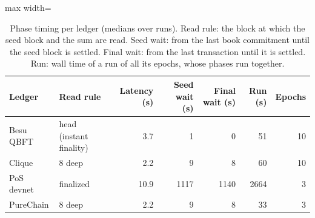 \begin{table}[!htbp]\centering\small
\caption{Phase timing per ledger (medians over runs). Read rule: the block at which the seed block and the sum are read. Seed wait: from the last book commitment until the seed block is settled. Final wait: from the last transaction until it is settled. Run: wall time of a run of all its epochs, whose phases run together.}\label{tab:ledgers}
\begin{adjustbox}{max width=\linewidth}\begin{tabular}{llrrrrr}\toprule
Ledger & Read rule & Latency (s) & Seed wait (s) & Final wait (s) & Run (s) & Epochs \\\midrule
Besu QBFT & head (instant finality) & 3.7 & 1 & 0 & 51 & 10 \\
Clique & 8 deep & 2.2 & 9 & 8 & 60 & 10 \\
PoS devnet & finalized & 10.9 & 1117 & 1140 & 2664 & 3 \\
PureChain & 8 deep & 2.2 & 9 & 8 & 33 & 3 \\
\bottomrule\end{tabular}\end{adjustbox}\end{table}